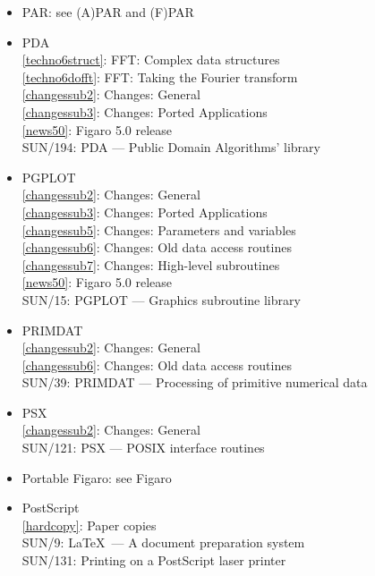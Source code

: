 \documentclass[11pt,twoside]{article}
\newcommand{\htmlref}[2]{#1}
\newcommand{\xref}[3]{#1}
\newcommand{\idxint}[2]{\ref{#1}: \htmlref{#2}{#1}}
\newcommand{\idxint}[2]{\htmlref{#2}{#1}}
\newcommand{\latorhtm}[2]{#1}
\newcommand{\latorhtm}[2]{#2}
\begin{document}
\begin{itemize}
\item PAR: see (A)PAR and (F)PAR
\item PDA\\
   \idxint{techno6struct}{FFT: Complex data structures}\\
   \idxint{techno6dofft}{FFT: Taking the Fourier transform}\\
   \idxint{changessub2}{Changes: General}\\
   \idxint{changessub3}{Changes: Ported Applications}\\
   \idxint{news50}{Figaro 5.0 release}\\
   \xref{SUN/194: PDA \latorhtm{---}{-} Public Domain Algorithms' library}{sun194}{}
\item PGPLOT\\
   \idxint{changessub2}{Changes: General}\\
   \idxint{changessub3}{Changes: Ported Applications}\\
   \idxint{changessub5}{Changes: Parameters and variables}\\
   \idxint{changessub6}{Changes: Old data access routines}\\
   \idxint{changessub7}{Changes: High-level subroutines}\\
   \idxint{news50}{Figaro 5.0 release}\\
   \xref{SUN/15: PGPLOT \latorhtm{---}{-} Graphics subroutine library}{sun15}{}
\item PRIMDAT\\
   \idxint{changessub2}{Changes: General}\\
   \idxint{changessub6}{Changes: Old data access routines}\\
   \xref{SUN/39: PRIMDAT \latorhtm{---}{-} Processing of primitive numerical data}{sun39}{}
\item PSX\\
   \idxint{changessub2}{Changes: General}\\
   \xref{SUN/121: PSX \latorhtm{---}{-} POSIX interface routines}{sun121}{}
\item Portable Figaro: see Figaro
\item PostScript\\
   \idxint{hardcopy}{Paper copies}\\
   \xref{SUN/9: \LaTeX\ \latorhtm{---}{-} A document preparation system}{sun9}{}\\
   \xref{SUN/131: Printing on a PostScript laser printer}{sun131}{}\\

\end{itemize}
\end{document}
